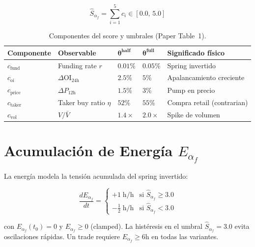 \documentclass[11pt,a4paper]{article}
\newcommand{\score}{\hat{S}_{\alpha_f}}
\newcommand{\energy}{E_{\alpha_f}}
\begin{document}
\begin{equation}
\score = \sum_{i=1}^{5} c_i \in [0.0, \, 5.0]
\label{eq:score}
\end{equation}

\begin{table}[H]
\centering
\caption{Componentes del score y umbrales (Paper Table~1).}
\label{tab:score}
\begin{tabular}{lllll}
\toprule
\textbf{Componente} & \textbf{Observable} & $\bm{\theta^{\text{half}}}$ & $\bm{\theta^{\text{full}}}$ & \textbf{Significado f\'isico} \\
\midrule
$c_{\text{fund}}$ & Funding rate $r$ & $0.01\%$ & $0.05\%$ & Spring invertido \\
$c_{\text{oi}}$ & $\Delta\text{OI}_{24\text{h}}$ & $2.5\%$ & $5\%$ & Apalancamiento creciente \\
$c_{\text{price}}$ & $\Delta P_{12\text{h}}$ & $1.5\%$ & $3\%$ & Pump en precio \\
$c_{\text{taker}}$ & Taker buy ratio $\eta$ & $52\%$ & $55\%$ & Compra retail (contrarian) \\
$c_{\text{vol}}$ & $V / \bar{V}$ & $1.4\times$ & $2.0\times$ & Spike de volumen \\
\bottomrule
\end{tabular}
\end{table}


\section{Acumulaci\'on de Energ\'ia $\energy$}
\label{sec:energy}

La energ\'ia modela la tensi\'on acumulada del spring invertido:

\begin{equation}
\frac{d\energy}{dt} = \begin{cases}
+1 \;\text{h/h} & \text{si } \score \geq 3.0 \\
-\tfrac{1}{2} \;\text{h/h} & \text{si } \score < 3.0
\end{cases}
\label{eq:energy}
\end{equation}

con $\energy(t_0) = 0$ y $\energy \geq 0$ (clamped). La hist\'eresis
en el umbral $\score = 3.0$ evita oscilaciones r\'apidas. Un trade
requiere $\energy \geq 6\text{h}$ en todas las variantes.


\end{document}

